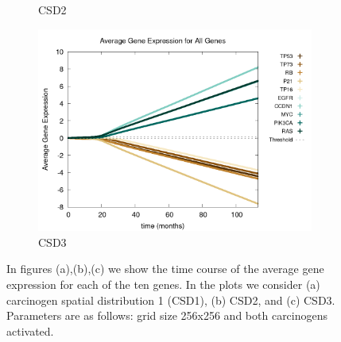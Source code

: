 \documentclass[\main/thesis.tex]{subfiles}
\begin{document}
\begin{figure}[H]
\begin{subfigure}[t]{.6\textwidth}
      \caption{CSD2}
      \label{fig:CarcinFunc_geneExpr_Func2}
    \end{subfigure}
    \begin{subfigure}[t]{.6\textwidth}
      \centering
      \includegraphics[width=\textwidth]{images/4_CarcinFunc/Fig3/geneExprAll_all_Func3.png}
      \caption{CSD3}
      \label{fig:CarcinFunc_geneExpr_Func3}
    \end{subfigure}
    \caption{In figures (a),(b),(c) we show the time course of the average gene expression for each of the ten genes. In the plots we consider (a) carcinogen spatial distribution 1 (CSD1), (b) CSD2, and (c) CSD3. Parameters are as follows: grid size 256x256 and both carcinogens activated.}
    \label{fig:CarcinFunc_geneExpr}
\end{figure}
\end{document}
